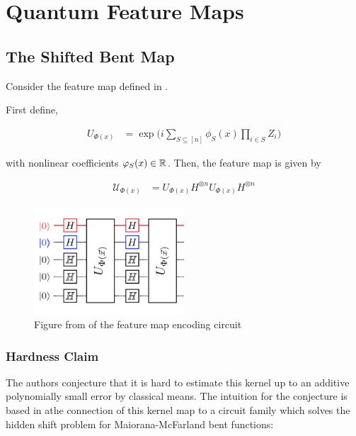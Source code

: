 \documentclass[main.tex]{subfiles}
\begin{document}
\section{Quantum Feature Maps}

\subsection{The Shifted Bent Map}

Consider the feature map defined in \cite{havlicek2018supervised}.

First define,

\begin{align}
\label{eq:diagonal-feat}
U_{\Phi(x)} &= \exp\Big(i \sum_{S \subseteq [n]} \phi_S(x) \prod_{i \in S} Z_i \Big)	
\end{align}

with nonlinear coefficients $\varphi_S(x) \in \mathbb{R}$. Then, the feature map is given by 


\begin{align}
\label{feat-map:hav}
\mathcal{U}_{\Phi(x)} &= U_{\Phi(x)} H^{\otimes n} U_{\Phi(x)} H^{\otimes n}
\end{align}

\begin{figure}[H]
\centering
\includegraphics[width=0.5\textwidth]{images/feature_map_circuit}
\caption{Figure from \cite{havlicek2018supervised} of the feature map encoding circuit}
\end{figure}


\subsubsection{Hardness Claim}

The authors conjecture that it is hard to estimate this kernel up to an additive polynomially small error by classical means. The intuition for the conjecture is based in athe connection of this kernel map to a circuit family which solves the hidden shift problem for Maiorana-McFarland bent functions:
\end{document}
